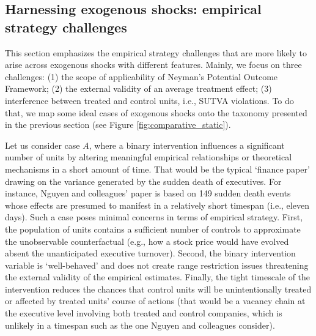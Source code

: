 \documentclass[11pt]{article}
\begin{document}
\begin{refsection}
\section{Harnessing exogenous shocks: empirical strategy challenges}
\label{sec:harnessing_exogenous_shocks}

\noindent This section emphasizes the empirical strategy challenges that are
more likely to arise across exogenous shocks with different features. Mainly, we
focus on three challenges: (1) the scope of applicability of Neyman's Potential
Outcome Framework; (2) the external validity of an average treatment effect; (3)
interference between treated and control units, i.e., SUTVA violations. To do
that, we map some ideal cases of exogenous shocks onto the taxonomy presented in
the previous section (see Figure \ref{fig:comparative_static}).

Let us consider case $A$, where a binary intervention influences a significant
number of units by altering meaningful empirical relationships or theoretical
mechanisms in a short amount of time. That would be the typical `finance paper'
drawing on the variance generated by the sudden death of executives. For
instance, Nguyen and colleagues' \autocite*{nguyen_et_al_2014} paper is based on
149 sudden death events whose effects are presumed to manifest in a relatively
short timespan (i.e., eleven days). Such a case poses minimal concerns in terms
of empirical strategy.  First, the population of units contains a sufficient
number of controls to approximate the unobservable counterfactual (e.g., how a
stock price would have evolved absent the unanticipated executive turnover).
Second, the binary intervention variable is `well-behaved' and does not create
range restriction issues threatening the external validity of the empirical
estimates.  Finally, the tight timescale of the intervention reduces the chances
that control units will be unintentionally treated or affected by treated units'
course of actions (that would be a vacancy chain at the executive level
involving both treated and control companies, which is unlikely in a timespan
such as the one Nguyen and colleagues \autocite*{nguyen_et_al_2014} consider). 

\vspace{2em}


\end{refsection}
\end{document}
